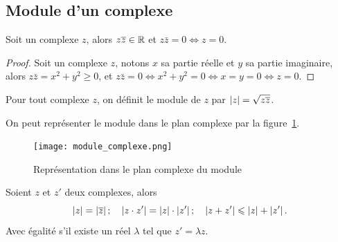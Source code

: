 \subsection{Module d'un complexe}
\label{subsec:modulecomplexe}

\begin{prop}
    Soit un complexe \(z\), alors \(z \overline{z} \in \mathbb{R}\) et \(z \bar{z} = 0 \iff z 
    = 0\).
\end{prop}

\begin{proof}
    Soit un complexe \(z\), notons \(x\) sa partie réelle et \(y\) sa partie 
    imaginaire, alors \(z \bar{z} = x^2 + y^2 \geqslant 0\), et \(z \bar{z} = 0 
    \iff x^2 + y^2 = 0 \iff x = y = 0 \iff z = 0\).
\end{proof}

\begin{defdef}
    Pour tout complexe \(z\), on définit le module de \(z\) par \(\left\lvert z\right\rvert = 
    \sqrt{z \overline{z}}\).
\end{defdef}

On peut représenter le module dans le plan complexe par la 
figure~\ref{fig:moduleComplexe}.

\begin{figure}
    \centering
    \texttt{[image: module\_complexe.png]}
    \caption{Représentation dans le plan complexe du module}
    \label{fig:moduleComplexe}
\end{figure}

\begin{prop}
    Soient \(z\) et \(z'\) deux complexes, alors
    \begin{equation}
        \left\lvert z\right\rvert = \left\lvert\overline{z}\right\rvert; \quad \left\lvert z \cdot z'\right\rvert = \left\lvert z\right\rvert \cdot 
        \left\lvert z'\right\rvert; \quad \left\lvert z + z'\right\rvert\leqslant\left\lvert z\right\rvert + \left\lvert z'\right\rvert.
    \end{equation}
    Avec égalité s'il existe un réel \(\lambda\) tel que \(z' = \lambda z\).
\end{prop}

